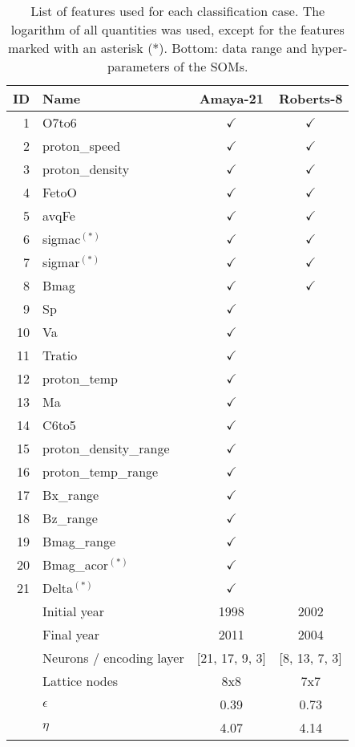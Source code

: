\documentclass[utf8]{frontiersSCNS} %
\begin{document}
\begin{table}\centering
	\begin{tabular}{@{}rlcc@{}}
		\toprule
		ID & Name  & Amaya-21 & Roberts-8 \\
		\midrule
		1 & O7to6 & $\checkmark$ & $\checkmark$ \\
		2 & proton\_speed & $\checkmark$ & $\checkmark$ \\
		3 & proton\_density & $\checkmark$ & $\checkmark$ \\
		4 & FetoO & $\checkmark$ & $\checkmark$ \\
		5 & avqFe & $\checkmark$ & $\checkmark$ \\
		6 & sigmac$^{(*)}$ & $\checkmark$ & $\checkmark$ \\
		7 & sigmar$^{(*)}$ & $\checkmark$ & $\checkmark$ \\
		8 & Bmag & $\checkmark$ & $\checkmark$ \\
		9 & Sp & $\checkmark$ & \\
		10 & Va & $\checkmark$ & \\
		11 & Tratio & $\checkmark$ & \\
		12 & proton\_temp & $\checkmark$ & \\
		13 & Ma & $\checkmark$ & \\
		14 & C6to5 & $\checkmark$ & \\
		15 & proton\_density\_range & $\checkmark$ & \\
		16 & proton\_temp\_range & $\checkmark$ & \\
		17 & Bx\_range & $\checkmark$ & \\
		18 & Bz\_range & $\checkmark$ & \\
		19 & Bmag\_range & $\checkmark$ & \\
		20 & Bmag\_acor$^{(*)}$ & $\checkmark$ & \\
		21 & Delta$^{(*)}$ & $\checkmark$ & \\
		\midrule
		 & Initial year & 1998 & 2002 \\
		 & Final year & 2011 & 2004 \\
		 & Neurons / encoding layer & [21, 17, 9, 3] & [8, 13, 7, 3] \\
		 & Lattice nodes &  8x8 &  7x7 \\
		 & $\epsilon$ &  0.39 & 0.73 \\
		 & $\eta$ & 4.07 & 4.14 \\
		\bottomrule
	\end{tabular}
	\caption{List of features used for each classification case. The logarithm of all quantities was used, except for the features marked with an asterisk (*). Bottom: data range and hyper-parameters of the SOMs.}
	\label{tab:features}
\end{table}
\end{document}
